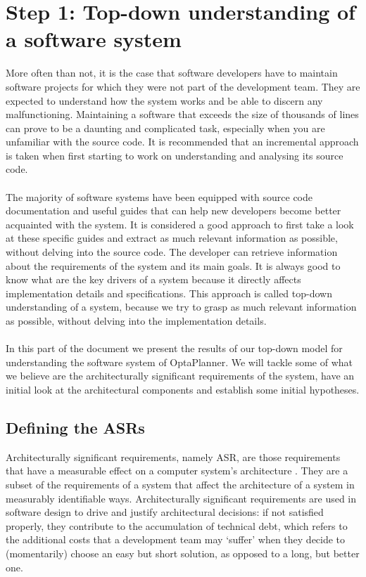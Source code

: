 \clearpage
\section{Step 1: Top-down understanding of a software system}
More often than not, it is the case that software developers have to maintain software projects for which they were not part of the development team. They are expected to understand how the system works and be able to discern any malfunctioning. Maintaining a software that exceeds the size of thousands of lines can prove to be a daunting and complicated task, especially when you are unfamiliar with the source code. It is recommended that an incremental approach is taken when first starting to work on understanding and analysing its source code. \\\\
The majority of software systems have been equipped with source code documentation and useful guides that can help new developers become better acquainted with the system. It is considered a good approach to first take a look at these specific guides and extract as much relevant information as possible, without delving into the source code. The developer can retrieve information about the requirements of the system and its main goals. It is always good to know what are the key drivers of a system because it directly affects implementation details and specifications. This approach is called top-down understanding of a system, because we try to grasp as much relevant information as possible, without delving into the implementation details. \\\\
In this part of the document we present the results of our top-down model for understanding the software system of OptaPlanner. We will tackle some of what we believe are the architecturally significant requirements of the system, have an initial look at the architectural components and establish some initial hypotheses. 
\subsection{Defining the ASRs}
\label{subsec:ASR}
Architecturally significant requirements, namely ASR, are those requirements that have a measurable effect on a computer system’s architecture \cite{asrs}. 
They are a subset of the requirements of a system that affect the architecture of a system in measurably identifiable ways. Architecturally significant requirements are used in software design to drive and justify architectural decisions: if not satisfied properly, they contribute to the accumulation of technical debt, which refers to the additional costs that a development team may `suffer' when they decide to (momentarily) choose an easy but short solution, as opposed to a long, but better one.
